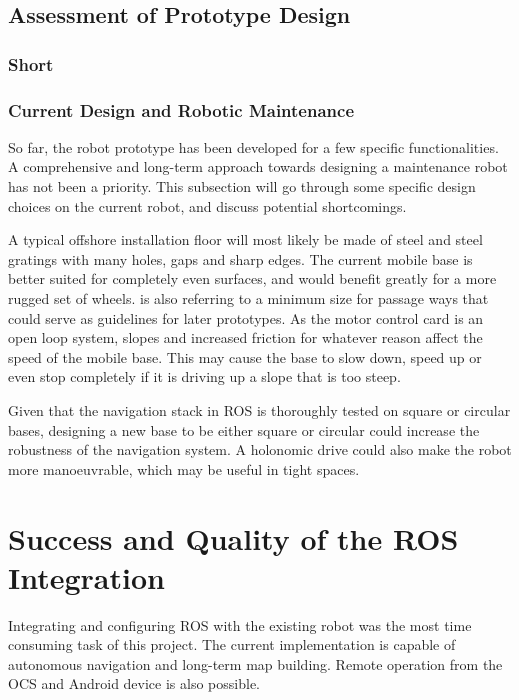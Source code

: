 \subsection{Assessment of Prototype Design}

\subsubsection{Short}

\subsubsection{Current Design and Robotic Maintenance}

So far, the robot prototype has been developed for a few specific functionalities. A comprehensive and long-term approach towards designing a maintenance robot has not been a priority. This subsection will go through some specific design choices on the current robot, and discuss potential shortcomings. 

A typical offshore installation floor will most likely be made of steel and steel gratings with many holes, gaps and sharp edges\cite{graf2008mobile}. The current mobile base is better suited for completely even surfaces, and would benefit greatly for a more rugged set of wheels. \cite{graf2008mobile} is also referring to a minimum size for passage ways that could serve as guidelines for later prototypes. As the motor control card is an open loop system, slopes and increased friction for whatever reason affect the speed of the mobile base. This may cause the base to slow down, speed up or even stop completely if it is driving up a slope that is too steep.

Given that the navigation stack in \ac{ROS} is thoroughly tested on square or circular bases, designing a new base to be either square or circular could increase the robustness of the navigation system. A holonomic drive could also make the robot more manoeuvrable, which may be useful in tight spaces.

\section{Success and Quality of the ROS Integration}

Integrating and configuring \ac{ROS} with the existing robot was the most time consuming task of this project. The current implementation is capable of autonomous navigation and long-term map building. Remote operation from the \ac{OCS} and Android device is also possible. 



